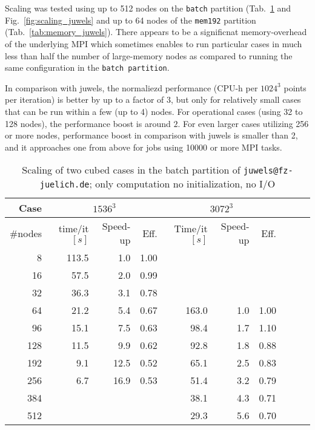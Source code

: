 Scaling was tested using up to 512 nodes on the \texttt{batch} partition (Tab.~\ref{tab:scaling_juwels} and Fig.~\ref{fig:scaling_juwels}
and up to 64 nodes of the \texttt{mem192} partition (Tab.~\ref{tab:memory_juwels}).
There appears to be a significnat memory-overhead of the underlying MPI 
which sometimes enables to run particular cases in much less than half the number of large-memory nodes as compared 
to running the same configuration in the \texttt{batch partition}.

In comparison with juwels, the normaliezd performance (CPU-h per $1024^3$ points per iteration) is better by up to a factor of $3$, but only for relatively small cases that can be run within a few (up to 4) nodes. For operational cases (using 32 to 128 nodes), the performance boost is around $2$. For even larger cases utilizing 256 or more nodes, performance boost in comparison with juwels is smaller than 2, and it approaches one from above for jobs using 10000 or more MPI tasks. 
%
\begin{table}
  \caption{Scaling of two cubed cases in the batch partition of \texttt{juwels@fz-juelich.de}; only computation no initialization, no I/O}
  {\footnotesize\begin{tabular}{r | r r r | r r r | rrr} 
    \toprule 
    Case   & \multicolumn{3}{c|}{$1536^3$} & \multicolumn{3}{c}{$3072^3$}\\
    \midrule
    \#nodes&        time/it $[s]$ & Speed-up & Eff. & Time/it $[s]$ & Speed-up & Eff.\\ 
    \midrule 
                        8 &      113.5&   1.0&  1.00 \\ 
    \rowcolor{gray!20} 16&        57.5&   2.0&  0.99\\ 
                       32&        36.3&   3.1&  0.78\\
    \rowcolor{gray!20} 64&        21.2&   5.4&  0.67& 163.0& 1.0& 1.00\\
                       96&        15.1&   7.5&  0.63&  98.4& 1.7& 1.10\\
    \rowcolor{gray!20}128&        11.5&   9.9&  0.62&  92.8& 1.8& 0.88\\
                      192&         9.1&  12.5&  0.52&  65.1& 2.5& 0.83\\
    \rowcolor{gray!20}256&         6.7&  16.9&  0.53&  51.4& 3.2& 0.79\\
                      384&                        &&&  38.1& 4.3& 0.71\\
    \rowcolor{gray!20}512&                        &&&  29.3& 5.6& 0.70\\ 
    \bottomrule
  \end{tabular}}
  \label{tab:scaling_juwels} 
\end{table}

